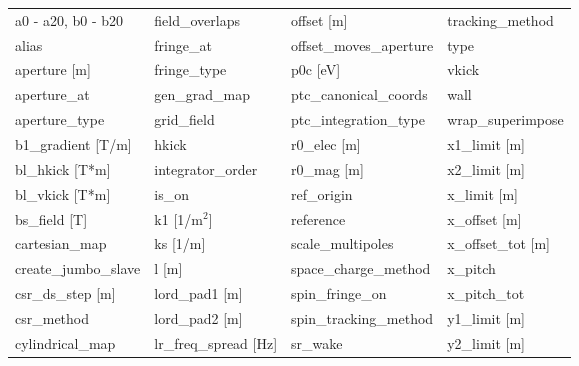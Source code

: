  \begin{tabular}{llll} \toprule
a0 - a20, b0 - b20               & field_overlaps                   & offset [m]                       & tracking_method                  \\
alias                            & fringe_at                        & offset_moves_aperture            & type                             \\
aperture [m]                     & fringe_type                      & p0c [eV]                         & vkick                            \\
aperture_at                      & gen_grad_map                     & ptc_canonical_coords             & wall                             \\
aperture_type                    & grid_field                       & ptc_integration_type             & wrap_superimpose                 \\
b1_gradient [T/m]                & hkick                            & r0_elec [m]                      & x1_limit [m]                     \\
bl_hkick [T*m]                   & integrator_order                 & r0_mag [m]                       & x2_limit [m]                     \\
bl_vkick [T*m]                   & is_on                            & ref_origin                       & x_limit [m]                      \\
bs_field [T]                     & k1 [1/m$^2$]                     & reference                        & x_offset [m]                     \\
cartesian_map                    & ks [1/m]                         & scale_multipoles                 & x_offset_tot [m]                 \\
create_jumbo_slave               & l [m]                            & space_charge_method              & x_pitch                          \\
csr_ds_step [m]                  & lord_pad1 [m]                    & spin_fringe_on                   & x_pitch_tot                      \\
csr_method                       & lord_pad2 [m]                    & spin_tracking_method             & y1_limit [m]                     \\
cylindrical_map                  & lr_freq_spread [Hz]              & sr_wake                          & y2_limit [m]                     \\

\end{tabular}
